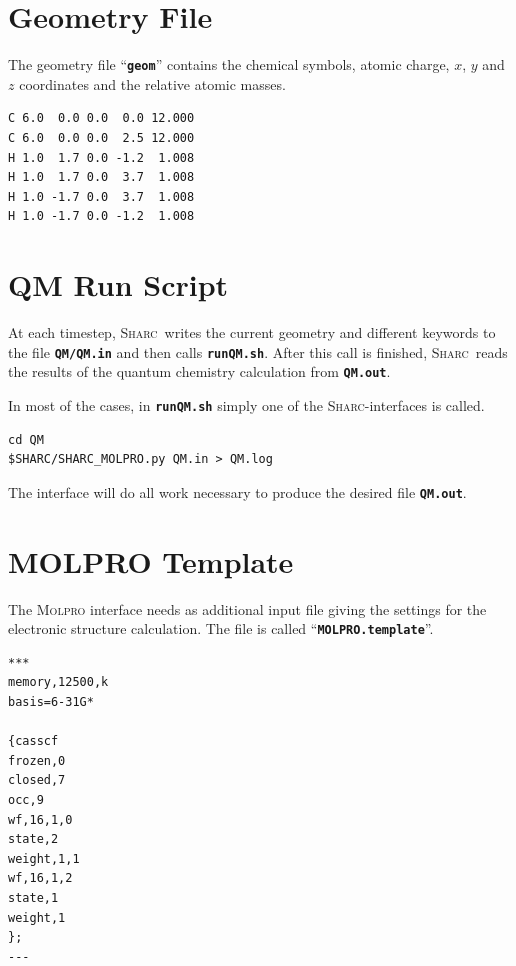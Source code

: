 \documentclass[a4paper,11pt,DIV=15,openany]{scrbook}
\newcommand{\sharc}{\textsc{Sharc}}
\newcommand{\ttt}[1]{\textbf{\texttt{#1}}}
\newenvironment{example}{
  \vspace{0mm}
  \definecolor{shadecolor}{HTML}{E4F4FF}
  \begin{shaded}
}{
  \end{shaded}
}
\begin{document}
\section{Geometry File}

The geometry file ``\ttt{geom}'' contains the chemical symbols, atomic charge, $x$, $y$ and $z$ coordinates and the relative atomic masses.

\begin{example}\vspace{-8mm}
\begin{verbatim}
C 6.0  0.0 0.0  0.0 12.000
C 6.0  0.0 0.0  2.5 12.000
H 1.0  1.7 0.0 -1.2  1.008
H 1.0  1.7 0.0  3.7  1.008
H 1.0 -1.7 0.0  3.7  1.008
H 1.0 -1.7 0.0 -1.2  1.008
\end{verbatim}\vspace{-5mm}
\end{example}

\section{QM Run Script}

At each timestep, \sharc\ writes the current geometry and different keywords to the file \ttt{QM/QM.in} and then calls \ttt{runQM.sh}. After this call is finished, \sharc\ reads the results of the quantum chemistry calculation from \ttt{QM.out}.

In most of the cases, in \ttt{runQM.sh} simply one of the \sharc-interfaces is called.
\begin{example}\vspace{-8mm}
\begin{verbatim}
cd QM
$SHARC/SHARC_MOLPRO.py QM.in > QM.log
\end{verbatim}\vspace{-5mm}
\end{example}
The interface will do all work necessary to produce the desired file \ttt{QM.out}.

\section{MOLPRO Template}

The \textsc{Molpro} interface needs as additional input file giving the settings for the electronic structure calculation. The file is called ``\ttt{MOLPRO.template}''.

\begin{example}\vspace{-8mm}
\begin{verbatim}
***
memory,12500,k
basis=6-31G*

{casscf
frozen,0
closed,7
occ,9
wf,16,1,0
state,2
weight,1,1
wf,16,1,2
state,1
weight,1
};
---
\end{verbatim}\vspace{-5mm}
\end{example}
\end{document}
